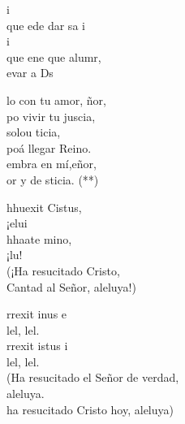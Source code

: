 \documentclass[12pt]{article}
\begin{document}
\begin{multicols*}{2}
\begin{cancion}%
	i \\
	que ede dar sa i \\
	i \\
	que ene que alumr,\\
	evar a Ds \\
\end{cancion}%

\begin{cancion}%
	lo con tu amor, ñor,\\
	po vivir tu juscia, \\
	solou ticia,\\
	poá llegar Reino.\\
	embra en mí,eñor,\\
	or y  de sticia. (**)\\
\end{cancion}%

\begin{cancion}%
	 hhuexit Cistus,\\
	¡elui \\
	 hhaate mino, \\
	¡lu! \\
(¡Ha resucitado Cristo,\\
Cantad al Señor, aleluya!)\\
\end{cancion}%

\begin{cancion}%
	rrexit inus e\\
	lel, lel.\\
	rrexit istus i\\
	lel, lel.\\
(Ha resucitado el Señor de verdad, \\
aleluya.\\
ha resucitado Cristo hoy, aleluya)\\
\end{cancion}%


\end{multicols*}
\end{document}
